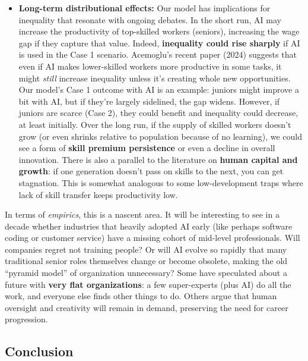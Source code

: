 \documentclass[12pt]{article}
\begin{document}
\begin{itemize}
\begin{itemize}
{    jobs} -- e.g., funding for R\&D in areas where humans can expand
    work with AI rather than be replaced.
  \end{itemize}
\item
  \textbf{Long-term distributional effects:} Our model has implications
  for inequality that resonate with ongoing debates. In the short run,
  AI may increase the productivity of top-skilled workers (seniors),
  increasing the wage gap if they capture that value. Indeed,
  \textbf{inequality could rise sharply} if AI is used in the Case 1
  scenario. Acemoglu's recent paper (2024) suggests that even if AI
  makes lower-skilled workers more productive in some tasks, it might
  \emph{still} increase inequality unless it's creating whole new
  opportunities. Our model's Case 1 outcome with AI is an example:
  juniors might improve a bit with AI, but if they're largely sidelined,
  the gap widens. However, if juniors are scarce (Case 2), they could
  benefit and inequality could decrease, at least initially. Over the
  long run, if the supply of skilled workers doesn't grow (or even
  shrinks relative to population because of no learning), we could see a
  form of \textbf{skill premium persistence} or even a decline in
  overall innovation. There is also a parallel to the literature on
  \textbf{human capital and growth}: if one generation doesn't pass on
  skills to the next, you can get stagnation. This is somewhat analogous
  to some low-development traps where lack of skill transfer keeps
  productivity low.
\end{itemize}

In terms of \emph{empirics}, this is a nascent area. It will be
interesting to see in a decade whether industries that heavily adopted
AI early (like perhaps software coding or customer service) have a
missing cohort of mid-level professionals. Will companies regret not
training people? Or will AI evolve so rapidly that many traditional
senior roles themselves change or become obsolete, making the old
``pyramid model'' of organization unnecessary? Some have speculated
about a future with \textbf{very flat organizations}: a few
super-experts (plus AI) do all the work, and everyone else finds other
things to do. Others argue that human oversight and creativity will
remain in demand, preserving the need for career progression.

\subsection{Conclusion}\label{conclusion}
\end{document}
